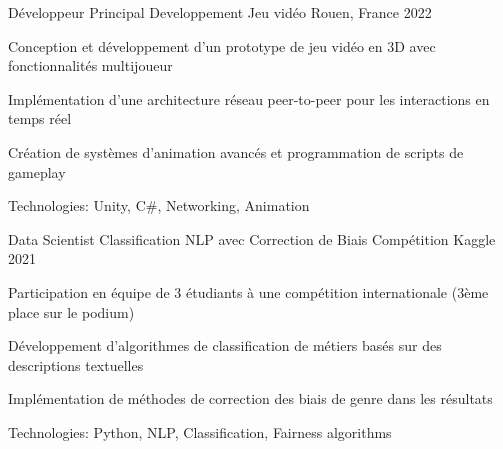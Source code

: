 \begin{cventries}


\cventry
{Développeur Principal} %
{Developpement Jeu vidéo} %
{Rouen, France} %
{2022} %
{ %
\begin{cvitems}
\item {Conception et développement d'un prototype de jeu vidéo en 3D avec fonctionnalités multijoueur}
\item {Implémentation d'une architecture réseau peer-to-peer pour les interactions en temps réel}
\item {Création de systèmes d'animation avancés et programmation de scripts de gameplay}
\item {Technologies: Unity, C\#, Networking, Animation}
\end{cvitems}
}
\vspace{1.5em}



\cventry
{Data Scientist} %
{Classification NLP avec Correction de Biais} %
{Compétition Kaggle} %
{2021} %
{ %
\begin{cvitems}
\item {Participation en équipe de 3 étudiants à une compétition internationale (3ème place sur le podium)}
\item {Développement d'algorithmes de classification de métiers basés sur des descriptions textuelles}
\item {Implémentation de méthodes de correction des biais de genre dans les résultats}
\item {Technologies: Python, NLP, Classification, Fairness algorithms}
\end{cvitems}
}


\end{cventries}